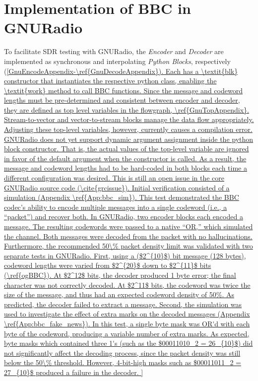 \documentclass[conference]{IEEEtran}
\begin{document}
\section{Implementation of BBC in GNURadio}
To facilitate SDR testing with GNURadio, the \textit{Encoder} and \textit{Decoder} are implemented as synchronous and interpolating \textit{Python Blocks}, respectively (\ref{GnuEncodeAppendix-\ref{GnuDecodeAppendix}). Each has a \textit{blk} constructor that instantiates the respective python class, enabling the \textit{work} method to call BBC functions. Since the message and codeword lengths must be pre-determined and consistent between encoder and decoder, they are defined as top level variables in the flowgraph, \ref{GnuTopAppendix}. Stream-to-vector and vector-to-stream blocks manage the data flow appropriately. 

Adjusting these top-level variables, however, currently causes a compilation error. GNURadio does not yet support dynamic argument assignment inside the python block constructor. That is, the actual values of the top-level variable are ignored in favor of the default argument when the constructor is called. As a result, the message and codeword lengths had to be hard-coded in both blocks each time a different configuration was desired. This is still an open issue in the core GNURadio source code (\cite{grcissue}).

Initial verification consisted of a simulation (Appendix \ref{App:bbc_sim}). This test demonstrated the BBC codec’s ability to encode multiple messages into a single codeword (i.e., a “packet”) and recover both. In GNURadio, two encoder blocks each encoded a message. The resulting codewords were passed to a native “OR,” which simulated the channel. Both messages were decoded from the packet with no hallucinations. 

Furthermore, the recommended 50\% packet density limit was validated with two separate tests in GNURadio. First, using a ($2^{10}$) bit message (128 bytes), codeword lengths were varied from $2^{20}$ down to $2^{11}$ bits (\ref{ogBBC}). At $2^12$ bits, the decoder produced 1 byte error; the final character was not correctly decoded. At $2^11$ bits, the codeword was twice the size of the message, and thus had an expected codeword density of 50%

Second, the simulation was used to investigate the effect of extra marks on the decoded messages (Appendix \ref{App:bbc_fake_news}). In this test, a single byte mask was OR'd with each byte of the codeword, producing a variable number of extra marks. As expected, byte masks which contained three 1's (such as the $00011010_2 = 26_{10}$) did not significantly affect the decoding process, since the packet density was still below the 50\% threshold. However, 4-bit-high masks such as $00011011_2 = 27_{10}$ produced a failure in the decoder. 

}
\end{document}

